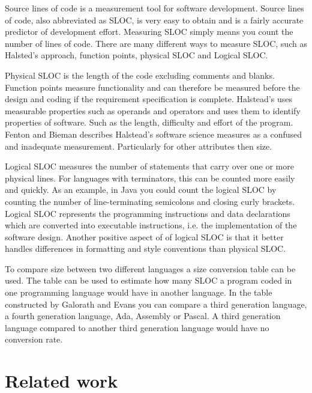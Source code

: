 Source lines of code is a measurement tool for software development. Source lines of code, also abbreviated as SLOC, is very easy to obtain and is a fairly accurate predictor of development effort\cite[p.~63]{galorath2006}. Measuring SLOC simply means you count the number of lines of code. There are many different ways to measure SLOC, such as Halsted’s approach, function points, physical SLOC and Logical SLOC. 

Physical SLOC is the length of the code excluding comments and blanks. Function points measure functionality and can therefore be measured before the design and coding if the requirement specification is complete\cite[p.~187]{galorath2006}. Halstead’s uses measurable properties such as operands and operators and uses them to identify properties of software. Such as the length, difficulty and effort of the program. Fenton and Bieman describes Halstead’s software science measures as a confused and inadequate measurement. Particularly for other attributes then size\cite[p.~345]{fenton2015}.

Logical SLOC measures the number of statements that carry over one or more physical lines.  For languages with terminators, this can be counted more easily and quickly. As an example, in Java you could count the logical SLOC by counting the number of line-terminating semicolons and closing curly brackets. Logical SLOC represents the programming instructions and data declarations which are converted into executable instructions, i.e. the implementation of the software design. Another positive aspect of of logical SLOC is that it better handles differences in formatting and style conventions than physical SLOC\cite[p.~155]{galorath2006}.

To compare size between two different languages a size conversion table can be used. The table can be used to estimate how many SLOC a program coded in one programming language would have in another language. In the table constructed by Galorath and Evans you can compare a third generation language, a fourth generation language, Ada, Assembly or Pascal\cite[p.~163]{galorath2006}. A third generation language compared to another third generation language would have no conversion rate. 

\section{Related work}\label{section-related-work}


